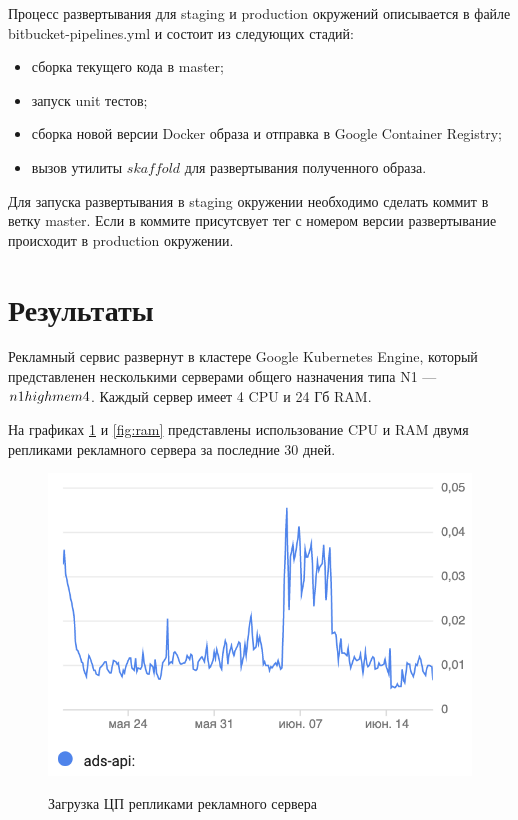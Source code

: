 \documentclass[specification,annotation,times]{itmo-student-thesis}
\begin{document}

Процесс развертывания для staging и production окружений описывается в файле bitbucket-pipelines.yml и состоит из следующих стадий:
\begin{itemize}
\item сборка текущего кода в master;
\item запуск unit тестов;
\item сборка новой версии Docker образа и отправка в Google Container Registry;
\item вызов утилиты $skaffold$ для развертывания полученного образа.
\end{itemize}

Для запуска развертывания в staging окружении необходимо сделать коммит в ветку master. Если в коммите присутсвует тег с номером версии развертывание происходит в production окружении.

\section{Результаты}

Рекламный сервис развернут в кластере Google Kubernetes Engine, который представленен несколькими серверами общего назначения типа N1 \cite{gke-machine-types} — $n1\-highmem\-4$. Каждый сервер имеет 4 CPU и 24 Гб RAM.

На графиках \ref{fig:cpu} и \ref{fig:ram} представлены использование CPU и RAM двумя репликами рекламного сервера за последние 30 дней.

\begin{figure}[!h]
\caption{Загрузка ЦП репликами рекламного сервера}
\includegraphics[height=0.2\paperheight]{cpu}
\centering
\label{fig:cpu}
\end{figure}
\end{document}
